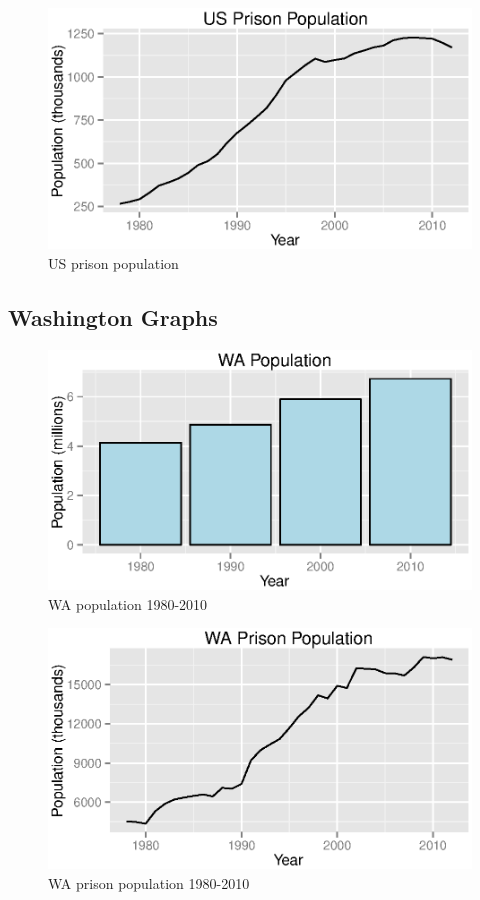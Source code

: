 \documentclass{exam}
\begin{document}
  \begin{figure}[H]
    \centering
    \includegraphics[scale = 0.9]{figures/us_prison_population.eps}
    \caption{US prison population}
  \end{figure}

  \subsection{Washington Graphs}

  \begin{figure}[H]
    \centering
    \includegraphics[scale = 0.9]{figures/wa_population.eps}
    \caption{WA population 1980-2010}
  \end{figure}

  \begin{figure}[H]
    \centering
    \includegraphics[scale = 0.9]{figures/wa_prison_population.eps}
    \caption{WA prison population 1980-2010}
  \end{figure}
\end{document}
